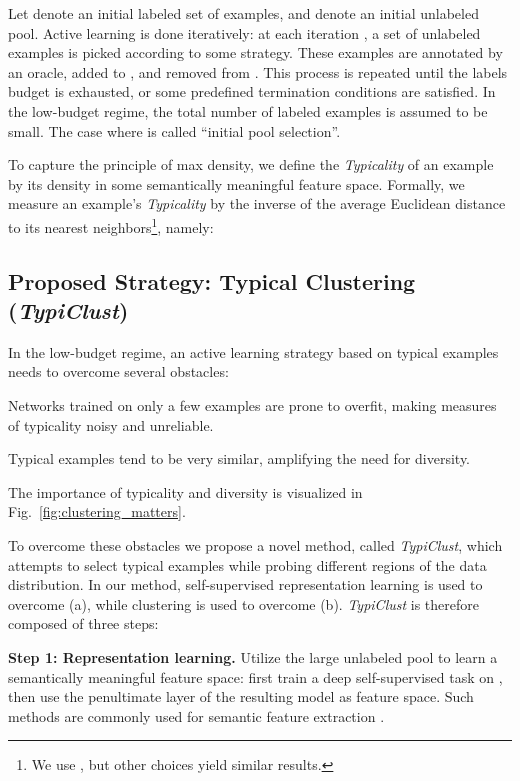 \documentclass{article}
\newcommand{\myparagraph}[1]{\smallskip\noindent\textbf{#1}}
\begin{document}
Let  denote an initial labeled set of examples, and  denote an initial unlabeled pool. Active learning is done iteratively: at each iteration , a set of  unlabeled examples is picked according to some strategy. These examples are annotated by an oracle, added to , and removed from . This process is repeated until the labels budget is exhausted, or some predefined termination conditions are satisfied. In the low-budget regime, the total number of labeled examples  is assumed to be small. The case where  is called ``initial pool selection''.




To capture the principle of max density, we define the \emph{Typicality} of an example by its density in some semantically meaningful feature space. Formally, we measure an example's \emph{Typicality} by the inverse of the average Euclidean distance to its  nearest neighbors\footnote{We use , but other choices yield similar results.}, namely: \begingroup\abovedisplayskip=4pt\belowdisplayskip=4pt

\endgroup

\subsection{Proposed Strategy: Typical Clustering (\emph{TypiClust})}

In the low-budget regime, an active learning strategy based on typical examples needs to overcome several obstacles: 
\begin{inparaenum}[(a)]
    \item Networks trained on only a few examples are prone to overfit, making measures of typicality noisy and unreliable.
    \item Typical examples tend to be very similar, amplifying the need for diversity.
\end{inparaenum}
The importance of typicality and diversity is visualized in Fig.~\ref{fig:clustering_matters}.

To overcome these obstacles we propose a novel method, called \emph{TypiClust}, which attempts to select typical examples while probing different regions of the data distribution. In our method, self-supervised representation learning is used to overcome (a), while clustering is used to overcome (b). \emph{TypiClust} is therefore composed of three steps:





\myparagraph{Step 1: Representation learning.}
Utilize the large unlabeled pool  to learn a semantically meaningful feature space: first train a deep self-supervised task on , then use the penultimate layer of the resulting model as feature space. Such methods are commonly used for semantic feature extraction \citep{chen2020simple, DBLP:conf/nips/GrillSATRBDPGAP20}.
\end{document}
